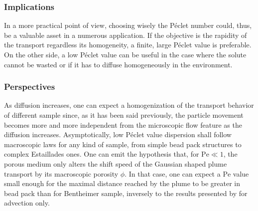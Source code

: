 \subsubsection{Implications}
In a more practical point of view, choosing wisely the Péclet number could, thus, be a valuable asset in a numerous application. If the objective is the rapidity of the transport regardless its homogeneity, a finite, large Péclet value is preferable. On the other side, a low Péclet value can be useful in the case where the solute cannot be wasted or if it has to diffuse homogeneously in the environment.

\subsubsection{Perspectives}

As diffusion increases, one can expect a homogenization of the transport behavior of different sample since, as it has been said previously, the particle movement becomes more and more independent from the microscopic flow feature as the diffusion increases.
Asymptotically, low Péclet value dispersion shall follow macroscopic laws for any kind of sample, from simple bead pack structures to complex Estaillades ones.
One can emit the hypothesis that, for $\mathrm{Pe}\ll 1$, the porous medium only alters the shift speed of the Gaussian shaped plume transport by its macroscopic porosity $\phi$. 
In that case, one can expect a $\mathrm{Pe}$ value small enough for the maximal distance reached by the plume to be greater in bead pack than for Bentheimer sample, inversely to the results presented by \cite{Meyer2016} for advection only.